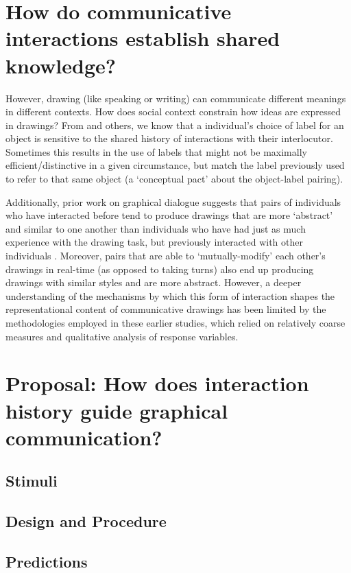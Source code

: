 \documentclass[12pt]{article}
\begin{document}
\section{How do communicative interactions establish shared knowledge?}

However, drawing (like speaking or writing) can communicate different meanings in different contexts. How does social context constrain how ideas are expressed in drawings? From  and others, we know that a individual's choice of label for an object is sensitive to the shared history of interactions with their interlocutor. Sometimes this results in the use of labels that might not be maximally efficient/distinctive in a given circumstance, but match the label previously used to refer to that same object (a ‘conceptual pact’ about the object-label pairing). 

Additionally, prior work on graphical dialogue suggests that pairs of individuals who have interacted before tend to produce drawings that are more `abstract' and similar to one another than individuals who have had just as much experience with the drawing task, but previously interacted with other individuals \cite{Healey:2007vq}. Moreover, pairs that are able to `mutually-modify' each other's drawings in real-time (as opposed to taking turns) also end up producing drawings with similar styles and are more abstract. However, a deeper understanding of the mechanisms by which this form of interaction shapes the representational content of communicative drawings has been limited by the methodologies employed in these earlier studies, which relied on relatively coarse measures and qualitative analysis of response variables. 

\section{Proposal: How does interaction history guide graphical communication?}

\subsection{Stimuli}

\subsection{Design and Procedure}

\subsection{Predictions}
\end{document}
